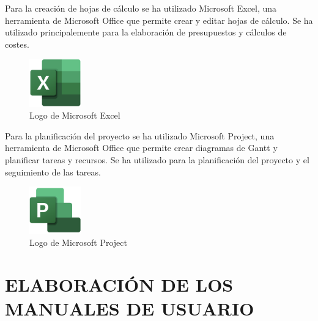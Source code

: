Para la creación de hojas de cálculo se ha utilizado Microsoft Excel, una herramienta de Microsoft Office que permite crear y editar hojas de cálculo.
Se ha utilizado principalemente para la elaboración de presupuestos y cálculos de costes.

\begin{figure}[H]
    \centering
    \includegraphics[width=0.2\textwidth]{figures/7-Construccion/Excel.png}
    \caption{Logo de Microsoft Excel}
\end{figure}

Para la planificación del proyecto se ha utilizado Microsoft Project, una herramienta de Microsoft Office que permite crear diagramas de Gantt y planificar tareas y recursos.
Se ha utilizado para la planificación del proyecto y el seguimiento de las tareas.

\begin{figure}[H]
    \centering
    \includegraphics[width=0.2\textwidth]{figures/7-Construccion/Project.png}
    \caption{Logo de Microsoft Project}
\end{figure}



\newpage
\section{ELABORACIÓN DE LOS MANUALES DE USUARIO}

